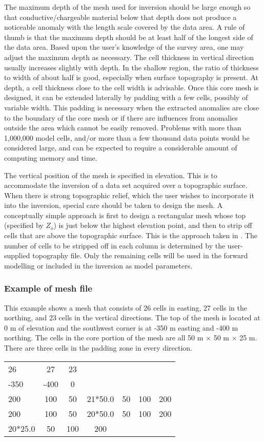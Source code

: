 The maximum depth of the mesh used for inversion should be large enough so that conductive/chargeable material below that depth does not produce a noticeable anomaly with the length scale covered by the data area. A rule of thumb is that the maximum depth should be at least half of the longest side of the data area. Based upon the user's knowledge of the survey area, one may adjust the maximum depth as necessary. The cell thickness in vertical direction usually increases slightly with depth. In the shallow region, the ratio of thickness to width of about half is good, especially when surface topography is present. At depth, a cell thickness close to the cell width is advisable. Once this core mesh is designed, it can be extended laterally by padding with a few cells, possibly of variable width. This padding is necessary when the extracted anomalies are close to the boundary of the core mesh or if there are influences from anomalies outside the area which cannot be easily removed. Problems with more than 1,000,000 model cells, and/or more than a few thousand data points would be considered large, and can be expected to require a considerable amount of computing memory and time.

The vertical position of the mesh is specified in elevation. This is to accommodate the inversion of a data set acquired over a topographic surface. When there is strong topographic relief, which the user wishes to incorporate it into the inversion, special care should be taken to design the mesh. A conceptually simple approach is first to design a rectangular mesh whose top (specified by $Z_o$) is just below the highest elevation point, and then to strip off cells that are above the topographic surface. This is the approach taken in \prog. The number of cells to be stripped off in each column is determined by the user-supplied topography file. Only the remaining cells will be used in the forward modelling or included in the inversion as model parameters.

\subsubsection*{Example of mesh file}

This example shows a mesh that consists of 26 cells in easting, 27 cells in the northing, and 23 cells in the vertical directions. The top of the mesh is located at 0 m of elevation and the southwest corner is at -350 m easting and -400 m northing. The cells in the core portion of the mesh are all 50 m $\times$ 50 m $\times$ 25 m. There are three cells in the padding zone in every direction.
%
\begin{fileExample}
\begin{tabular}{|lcccccc|}
\hline
26   &   27 & 23 &         &    &     & \\
-350 & -400 & 0  &         &    &     & \\
200  & 100  & 50 & 21*50.0 & 50 & 100 & 200 \\
200  & 100  & 50 & 20*50.0 & 50 & 100 & 200 \\
20*25.0 & 50 & 100 & 200   &    &     & \\
\hline
\end{tabular}
\end{fileExample}
